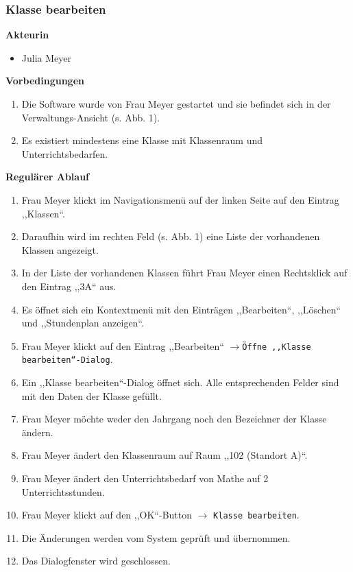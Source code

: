 \documentclass[fontsize=12pt,paper=a4,twoside]{scrartcl}
\begin{document}
\subsubsection{Klasse bearbeiten}
\label{subsubsec:KlasseBearbeiten}

\textbf{Akteurin}
\begin{itemize}
\item Julia Meyer
\end{itemize}
\vspace{5pt}


\textbf{Vorbedingungen}
\begin{enumerate}
\item Die Software wurde von Frau Meyer gestartet und sie befindet sich in der Verwaltungs-Ansicht (s. Abb. 1).
\item Es existiert mindestens eine Klasse mit Klassenraum und Unterrichtsbedarfen.
\end{enumerate}
\vspace{5pt}


\textbf{Regulärer Ablauf}
\begin{enumerate}
\item Frau Meyer klickt im Navigationsmenü auf der linken Seite auf den Eintrag ,,Klassen``.
\item Daraufhin wird im rechten Feld (s. Abb. 1) eine Liste der vorhandenen Klassen angezeigt.
\item In der Liste der vorhandenen Klassen f\"uhrt Frau Meyer einen Rechtsklick auf den Eintrag ,,3A`` aus.
\item Es \"offnet sich ein Kontextmen\"u mit den Eintr\"agen ,,Bearbeiten``, ,,L\"oschen`` und ,,Stundenplan anzeigen``.
\item Frau Meyer klickt auf den Eintrag ,,Bearbeiten`` $\rightarrow$\texttt{Öffne ,,Klasse bearbeiten``-Dialog}.
\item Ein ,,Klasse bearbeiten``-Dialog öffnet sich. Alle entsprechenden Felder sind mit den Daten der Klasse gefüllt.
\item Frau Meyer möchte weder den Jahrgang noch den Bezeichner der Klasse ändern.
\item Frau Meyer ändert den Klassenraum auf Raum ,,102 (Standort A)``.
\item Frau Meyer ändert den Unterrichtsbedarf von Mathe auf 2 Unterrichtsstunden.
\item Frau Meyer klickt auf den ,,OK``-Button $\rightarrow$ \texttt{Klasse bearbeiten}.
\item Die Änderungen werden vom System geprüft und übernommen.
\item Das Dialogfenster wird geschlossen.
\end{enumerate}
\vspace{5pt}
\end{document}
